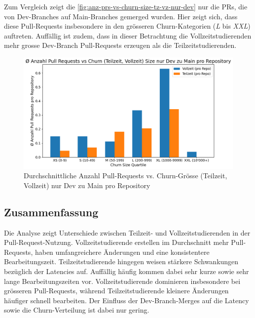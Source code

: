 \newpage
Zum Vergleich zeigt die \autoref{fig:anz-prs-vs-churn-size-tz-vz-nur-dev} nur die PRs, die von Dev-Branches auf Main-Branches gemerged wurden. Hier zeigt sich, dass diese Pull-Requests insbesondere in den grösseren Churn-Kategorien (\textit{L} bis \textit{XXL}) auftreten. Auffällig ist zudem, dass in dieser Betrachtung die Vollzeitstudierenden mehr grosse Dev-Branch Pull-Requests erzeugen als die Teilzeitstudierenden.

\begin{figure}[htbp]
    \includegraphics[width=\textwidth]{Figures/avg-anz-prs-vs-churn-size-tz-vz-pro-repo-nur-dev.png}
    \caption{Durchschnittliche Anzahl Pull-Requests vs. Churn-Grösse (Teilzeit, Vollzeit) nur Dev zu Main pro Repository}
    \label{fig:anz-prs-vs-churn-size-tz-vz-nur-dev}
\end{figure}

\subsection{Zusammenfassung}

Die Analyse zeigt Unterschiede zwischen Teilzeit- und Vollzeitstudierenden in der Pull-Request-Nutzung. Vollzeitstudierende erstellen im Durchschnitt mehr Pull-Requests, haben umfangreichere Änderungen und eine konsistentere Bearbeitungszeit. Teilzeitstudierende hingegen weisen stärkere Schwankungen bezüglich der Latencies auf. Auffällig häufig kommen dabei sehr kurze sowie sehr lange Bearbeitungszeiten vor. Vollzeitstudierende dominieren insbesondere bei grösseren Pull-Requests, während Teilzeitstudierende kleinere Änderungen häufiger schnell bearbeiten. Der Einfluss der Dev-Branch-Merges auf die Latency sowie die Churn-Verteilung ist dabei nur gering. 
